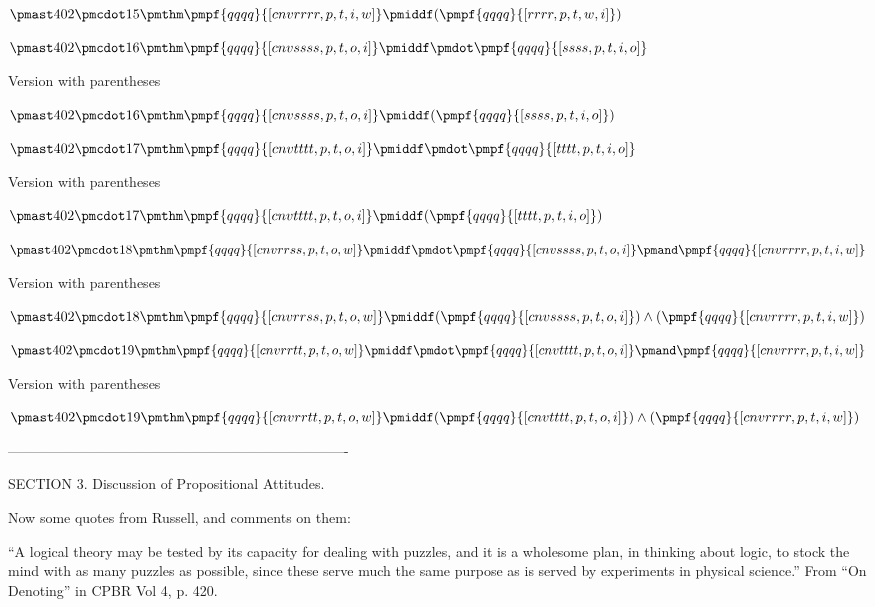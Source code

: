 \documentclass[12pt]{article}
\begin{document}
$\pmast 402 \pmcdot 15 \pmthm \pmpf{qqqq}{[cnvrrrr, p, t, i, w]} \pmiddf  (  \pmpf{qqqq}{[rrrr, p, t, w, i]} )$


$\pmast 402 \pmcdot 16 \pmthm \pmpf{qqqq}{[cnvssss, p, t, o, i]} \pmiddf \pmdot \pmpf{qqqq}{[ssss, p, t, i, o]} $
 
 

Version with parentheses

$\pmast 402 \pmcdot 16 \pmthm \pmpf{qqqq}{[cnvssss, p, t, o, i]} \pmiddf  (  \pmpf{qqqq}{[ssss, p, t, i, o]} )$


$\pmast 402 \pmcdot 17 \pmthm \pmpf{qqqq}{[cnvtttt, p, t, o, i]} \pmiddf \pmdot \pmpf{qqqq}{[tttt, p, t, i, o]} $
 
 

Version with parentheses

$\pmast 402 \pmcdot 17 \pmthm \pmpf{qqqq}{[cnvtttt, p, t, o, i]} \pmiddf  (  \pmpf{qqqq}{[tttt, p, t, i, o]} )$


$\pmast 402 \pmcdot 18 \pmthm \pmpf{qqqq}{[cnvrrss, p, t, o, w]} \pmiddf \pmdot \pmpf{qqqq}{[cnvssss, p, t, o, i]} \pmand \pmpf{qqqq}{[cnvrrrr, p, t, i, w]} $
 
 

Version with parentheses

$\pmast 402 \pmcdot 18 \pmthm \pmpf{qqqq}{[cnvrrss, p, t, o, w]} \pmiddf  (  \pmpf{qqqq}{[cnvssss, p, t, o, i]} ) \land ( \pmpf{qqqq}{[cnvrrrr, p, t, i, w]} )$


$\pmast 402 \pmcdot 19 \pmthm \pmpf{qqqq}{[cnvrrtt, p, t, o, w]} \pmiddf \pmdot \pmpf{qqqq}{[cnvtttt, p, t, o, i]} \pmand \pmpf{qqqq}{[cnvrrrr, p, t, i, w]} $
 
 

Version with parentheses

$\pmast 402 \pmcdot 19 \pmthm \pmpf{qqqq}{[cnvrrtt, p, t, o, w]} \pmiddf  (  \pmpf{qqqq}{[cnvtttt, p, t, o, i]} ) \land ( \pmpf{qqqq}{[cnvrrrr, p, t, i, w]} )$


-------------------------------------------------------------------------

SECTION 3. Discussion of Propositional Attitudes.

Now some quotes from Russell, and comments on them:

“A logical theory may be tested by its capacity for dealing with puzzles, and it is a wholesome plan, in thinking about logic, to stock the mind with as many puzzles as possible, since these serve much the same purpose as is served by experiments in physical science.” From “On Denoting” in CPBR Vol 4, p. 420.
\end{document}
